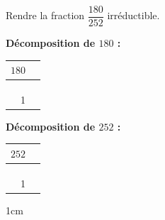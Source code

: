 \documentclass[a4paper]{book}
\begin{document}
    \begin{exemple}
        Rendre la fraction $\dfrac{180}{252}$ irréductible.

        \medskip
        \noindent
        \begin{minipage}[t]{0.45\textwidth}
            \textbf{Décomposition de $180$ :}
            \begin{center}
            \renewcommand{\arraystretch}{1.6}
            \begin{tabular}{r|l}
                $180$ & \\ \hline
                      & \\ \hline
                      & \\ \hline
                      & \\ \hline
                    1 & \\
            \end{tabular}
            \end{center}
        \end{minipage}
        \hfill
        \begin{minipage}[t]{0.45\textwidth}
            \textbf{Décomposition de $252$ :}
            \begin{center}
            \renewcommand{\arraystretch}{1.6}
            \begin{tabular}{r|l}
                $252$ & \\ \hline
                      & \\ \hline
                      & \\ \hline
                      & \\ \hline
                    1 & \\
            \end{tabular}
            \end{center}
        \end{minipage}

        \begin{ZoneReponse}{1cm}
        \end{ZoneReponse}
    \end{exemple}
\end{document}
